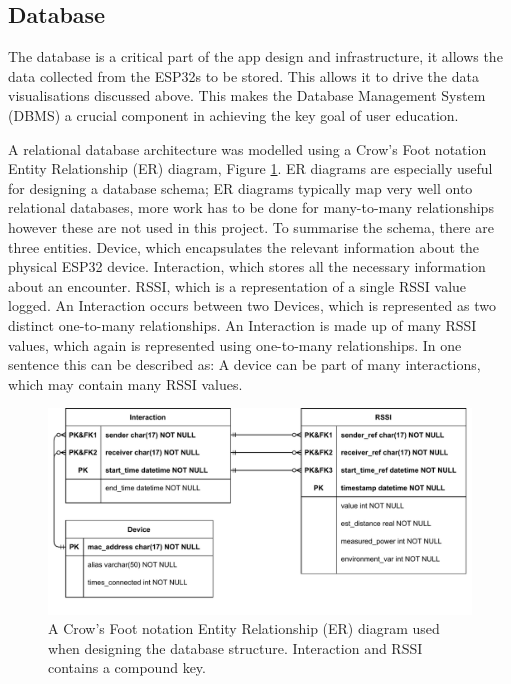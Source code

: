 \documentclass{l4proj}
\begin{document}
\subsection{Database}

The database is a critical part of the app design and infrastructure, it allows the data collected from the ESP32s to be stored. This allows it to drive the data visualisations discussed above. This makes the Database Management System (DBMS) a crucial component in achieving the key goal of user education.

A relational database architecture was modelled using a Crow's Foot notation Entity Relationship (ER) diagram, Figure \ref{fig:er_diagram}. ER diagrams are especially useful for designing a database schema; ER diagrams typically map very well onto relational databases, more work has to be done for many-to-many relationships however these are not used in this project. To summarise the schema, there are three entities. Device,  which encapsulates the relevant information about the physical ESP32 device. Interaction, which stores all the necessary information about an encounter. RSSI, which is a representation of a single RSSI value logged. An Interaction occurs between two Devices, which is represented as two distinct one-to-many relationships. An Interaction is made up of many RSSI values, which again is represented using one-to-many relationships. In one sentence this can be described as: A device can be part of many interactions, which may contain many RSSI values.

\begin{figure}[!htb]
    \centering
    \includegraphics[width=0.9\linewidth]{images/rssi_er.pdf}

    \caption{ A Crow's Foot notation Entity Relationship (ER) diagram used when designing the database structure. Interaction and RSSI contains a compound key. }

    \label{fig:er_diagram}
\end{figure}
\end{document}
